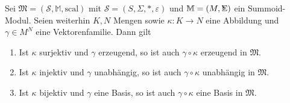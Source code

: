 \documentclass{article}
\DeclareMathOperator*{\Sigmacirc}{%
  \ThisStyle{\mathop{\ensurestackMath{\stackinset{c}{-0.75\LMpt}{c}{}{%
  \rotatebox[origin=lb]{-90}{$\circ$}}{\SavedStyle\Sigma}}}}}
\begin{document}
\begin{theorem}
  Sei $\mathfrak{M} = (\mathcal{S}, \mathbb{M}, \text{scal})$ 
  mit $\mathcal{S} = (S, \Sigma, \ast, \varepsilon)$
  und $\mathbb{M} = (M, \Sigmacirc)$ ein Summoid-Modul.
  Seien weiterhin $K, N$ Mengen sowie $\kappa \colon K \to N$ eine Abbildung und $\gamma \in M^N$ eine Vektorenfamilie.
  Dann gilt
  \begin{enumerate}
    \item Ist $\kappa$ surjektiv und $\gamma$ erzeugend, so ist auch $\gamma \circ \kappa$ erzeugend in $\mathfrak{M}$.
    \item Ist $\kappa$ injektiv und $\gamma$ unabhängig, so ist auch $\gamma \circ \kappa$ unabhängig in $\mathfrak{M}$.
    \item Ist $\kappa$ bijektiv und $\gamma$ eine Basis, so ist auch $\gamma \circ \kappa$ eine Basis in $\mathfrak{M}$.
  \end{enumerate}
\end{theorem}
\end{document}
